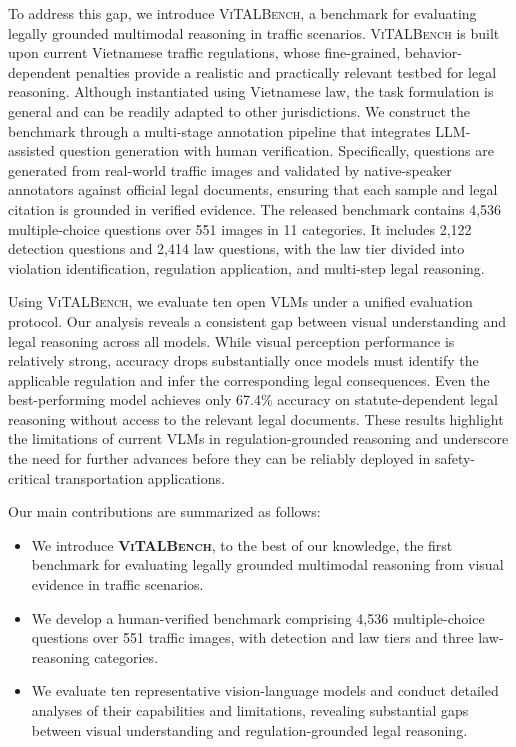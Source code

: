 To address this gap, we introduce \textsc{ViTALBench}, a benchmark for evaluating legally grounded multimodal reasoning in traffic scenarios. \textsc{ViTALBench} is built upon current Vietnamese traffic regulations, whose fine-grained, behavior-dependent penalties provide a realistic and practically relevant testbed for legal reasoning. Although instantiated using Vietnamese law, the task formulation is general and can be readily adapted to other jurisdictions. We construct the benchmark through a multi-stage annotation pipeline that integrates LLM-assisted question generation with human verification. Specifically, questions are generated from real-world traffic images and validated by native-speaker annotators against official legal documents, ensuring that each sample and legal citation is grounded in verified evidence. The released benchmark contains 4,536 multiple-choice questions over 551 images in 11 categories. It includes 2,122 detection questions and 2,414 law questions, with the law tier divided into violation identification, regulation application, and multi-step legal reasoning.

Using \textsc{ViTALBench}, we evaluate ten open VLMs under a unified evaluation protocol. Our analysis reveals a consistent gap between visual understanding and legal reasoning across all models. While visual perception performance is relatively strong, accuracy drops substantially once models must identify the applicable regulation and infer the corresponding legal consequences. Even the best-performing model achieves only 67.4\% accuracy on statute-dependent legal reasoning without access to the relevant legal documents. These results highlight the limitations of current VLMs in regulation-grounded reasoning and underscore the need for further advances before they can be reliably deployed in safety-critical transportation applications.

Our main contributions are summarized as follows:

\begin{itemize}

\item We introduce \textbf{\textsc{ViTALBench}}, to the best of our knowledge, the first benchmark for evaluating legally grounded multimodal reasoning from visual evidence in traffic scenarios.

\item We develop a human-verified benchmark comprising 4,536 multiple-choice questions over 551 traffic images, with detection and law tiers and three law-reasoning categories.

\item We evaluate ten representative vision-language models and conduct detailed analyses of their capabilities and limitations, revealing substantial gaps between visual understanding and regulation-grounded legal reasoning.

\end{itemize}
